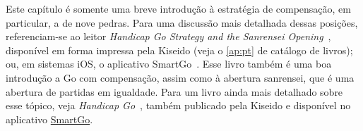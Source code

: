 \bigskip

Este capítulo é somente uma breve introdução à estratégia de compensação, em particular, a de nove pedras. Para uma discussão mais detalhada dessas posições, referenciam-se ao leitor \emph{Handicap Go Strategy and the Sanrensei Opening}~\cite{zeijst_bozulich_handicap_sanrensei}, disponível em forma impressa pela Kiseido (veja o \autoref{ap:pt} de catálogo de livros); ou, em sistemas iOS, o aplicativo SmartGo~\cite{smartgo}. Esse livro também é uma boa introdução a Go com compensação, assim como à abertura sanrensei, que é uma abertura de partidas em igualdade. Para um livro ainda mais detalhado sobre esse tópico, veja \emph{Handicap Go}~\cite{nagahara_bozulich_handicap_go}, também publicado pela Kiseido e disponível no aplicativo \href{apps.apple.com/us/app/smartgo-player/id314506629}{SmartGo}.